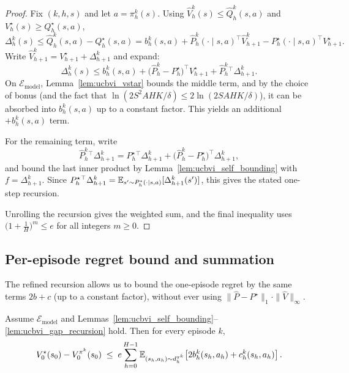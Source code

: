 \begin{proof}
Fix $(k,h,s)$ and let $a=\pi_h^k(s)$. Using $\widehat V_h^k(s)\le \widehat Q_h^k(s,a)$ and
$V_h^\star(s)\ge Q_h^\star(s,a)$,
\[
\Delta_h^k(s)\le \widehat Q_h^k(s,a)-Q_h^\star(s,a)
= b_h^k(s,a) + \widehat P_h^k(\cdot\mid s,a)^\top \widehat V_{h+1}^k
- P_h^\star(\cdot\mid s,a)^\top V_{h+1}^\star.
\]
Write $\widehat V_{h+1}^k=V_{h+1}^\star+\Delta_{h+1}^k$ and expand:
\[
\Delta_h^k(s)\le b_h^k(s,a)
+ \big(\widehat P_h^k-P_h^\star\big)^\top V_{h+1}^\star
+ \widehat P_h^k{}^\top \Delta_{h+1}^k.
\]
On $\mathcal{E}_{\mathrm{model}}$, Lemma~\ref{lem:ucbvi_vstar} bounds the middle term, and by the
choice of bonus (and the fact that $\ln(2S^2AHK/\delta)\le 2\ln(2SAHK/\delta)$), it can be absorbed
into $b_h^k(s,a)$ up to a constant factor. This yields an additional $+b_h^k(s,a)$ term.

For the remaining term, write
\[
\widehat P_h^k{}^\top \Delta_{h+1}^k
=
P_h^\star{}^\top \Delta_{h+1}^k
+
\big(\widehat P_h^k-P_h^\star\big)^\top \Delta_{h+1}^k,
\]
and bound the last inner product by Lemma~\ref{lem:ucbvi_self_bounding} with $f=\Delta_{h+1}^k$.
Since $P_h^\star{}^\top \Delta_{h+1}^k=\mathbb{E}_{s'\sim P_h^\star(\cdot\mid s,a)}[\Delta_{h+1}^k(s')]$, this gives
the stated one-step recursion.

Unrolling the recursion gives the weighted sum, and the final inequality uses
$\big(1+\tfrac{1}{H}\big)^{m}\le e$ for all integers $m\ge 0$.
\end{proof}

\subsection{Per-episode regret bound and summation}

The refined recursion allows us to bound the one-episode regret by the same terms
$2b+c$ (up to a constant factor), without ever using $\|\widehat P-P^\star\|_1\cdot \|\widehat V\|_\infty$.

\begin{lemma}
\label{lem:ucbvi_refined_episode}
Assume $\mathcal{E}_{\mathrm{model}}$ and Lemmas~\ref{lem:ucbvi_self_bounding}--\ref{lem:ucbvi_gap_recursion} hold.
Then for every episode $k$,
\[
V_0^\star(s_0)-V_0^{\pi^k}(s_0)
\;\le\;
e\sum_{h=0}^{H-1}\mathbb{E}_{(s_h,a_h)\sim d_h^{\pi^k}}\!\left[2b_h^k(s_h,a_h)+c_h^k(s_h,a_h)\right].
\]
\end{lemma}

